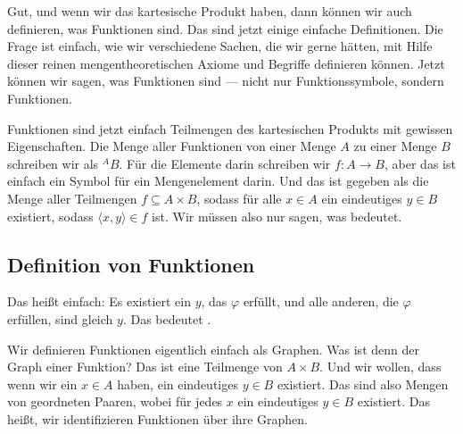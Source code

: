 \begin{spoken-clean}[00:57:37 - 00:59:51]
Gut, und wenn wir das kartesische Produkt haben, dann können wir auch definieren, was Funktionen sind. Das sind jetzt einige einfache Definitionen. Die Frage ist einfach, wie wir verschiedene Sachen, die wir gerne hätten, mit Hilfe dieser reinen mengentheoretischen Axiome und Begriffe definieren können. Jetzt können wir sagen, was Funktionen sind --- nicht nur Funktionssymbole, sondern Funktionen.

Funktionen sind jetzt einfach Teilmengen des kartesischen Produkts mit gewissen Eigenschaften. Die Menge aller Funktionen von einer Menge $A$ zu einer Menge $B$ schreiben wir als ${}^A B$. Für die Elemente darin schreiben wir $f \colon A \to B$, aber das ist einfach ein Symbol für ein Mengenelement darin. Und das ist gegeben als die Menge aller Teilmengen $f \subseteq A \times B$, sodass für alle $x \in A$ ein eindeutiges $y \in B$ existiert, sodass $\langle x, y \rangle \in f$ ist. Wir müssen also nur sagen, was  bedeutet.
\end{spoken-clean}

\subsection{Definition von Funktionen}
\begin{math-stroke}

\end{math-stroke}

\begin{spoken-clean}[01:02:05 - 01:02:54]
Das heißt einfach: Es existiert ein $y$, das $\varphi$ erfüllt, und alle anderen, die $\varphi$ erfüllen, sind gleich $y$. Das bedeutet .

Wir definieren Funktionen eigentlich einfach als Graphen. Was ist denn der Graph einer Funktion? Das ist eine Teilmenge von $A \times B$. Und wir wollen, dass wenn wir ein $x \in A$ haben, ein eindeutiges $y \in B$ existiert. Das sind also Mengen von geordneten Paaren, wobei für jedes $x$ ein eindeutiges $y \in B$ existiert. Das heißt, wir identifizieren Funktionen über ihre Graphen.
\end{spoken-clean}

